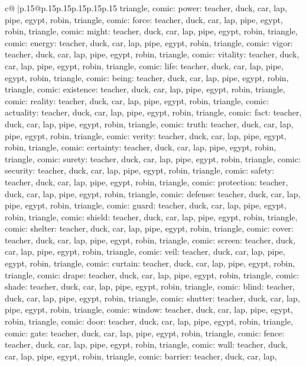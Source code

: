 \documentclass{article}
\begin{document}
{\begin{supertabular}{c@{$\;$}|p{.15\linewidth}@{}p{.15\linewidth}p{.15\linewidth}p{.15\linewidth}p{.15\linewidth}p{.15\linewidth}}
{{{triangle, comic\n\nCLUE: power\nTARGETS: teacher, duck, car, lap, pipe, egypt, robin, triangle, comic\n\nCLUE: force\nTARGETS: teacher, duck, car, lap, pipe, egypt, robin, triangle, comic\n\nCLUE: might\nTARGETS: teacher, duck, car, lap, pipe, egypt, robin, triangle, comic\n\nCLUE: energy\nTARGETS: teacher, duck, car, lap, pipe, egypt, robin, triangle, comic\n\nCLUE: vigor\nTARGETS: teacher, duck, car, lap, pipe, egypt, robin, triangle, comic\n\nCLUE: vitality\nTARGETS: teacher, duck, car, lap, pipe, egypt, robin, triangle, comic\n\nCLUE: life\nTARGETS: teacher, duck, car, lap, pipe, egypt, robin, triangle, comic\n\nCLUE: being\nTARGETS: teacher, duck, car, lap, pipe, egypt, robin, triangle, comic\n\nCLUE: existence\nTARGETS: teacher, duck, car, lap, pipe, egypt, robin, triangle, comic\n\nCLUE: reality\nTARGETS: teacher, duck, car, lap, pipe, egypt, robin, triangle, comic\n\nCLUE: actuality\nTARGETS: teacher, duck, car, lap, pipe, egypt, robin, triangle, comic\n\nCLUE: fact\nTARGETS: teacher, duck, car, lap, pipe, egypt, robin, triangle, comic\n\nCLUE: truth\nTARGETS: teacher, duck, car, lap, pipe, egypt, robin, triangle, comic\n\nCLUE: verity\nTARGETS: teacher, duck, car, lap, pipe, egypt, robin, triangle, comic\n\nCLUE: certainty\nTARGETS: teacher, duck, car, lap, pipe, egypt, robin, triangle, comic\n\nCLUE: surety\nTARGETS: teacher, duck, car, lap, pipe, egypt, robin, triangle, comic\n\nCLUE: security\nTARGETS: teacher, duck, car, lap, pipe, egypt, robin, triangle, comic\n\nCLUE: safety\nTARGETS: teacher, duck, car, lap, pipe, egypt, robin, triangle, comic\n\nCLUE: protection\nTARGETS: teacher, duck, car, lap, pipe, egypt, robin, triangle, comic\n\nCLUE: defense\nTARGETS: teacher, duck, car, lap, pipe, egypt, robin, triangle, comic\n\nCLUE: guard\nTARGETS: teacher, duck, car, lap, pipe, egypt, robin, triangle, comic\n\nCLUE: shield\nTARGETS: teacher, duck, car, lap, pipe, egypt, robin, triangle, comic\n\nCLUE: shelter\nTARGETS: teacher, duck, car, lap, pipe, egypt, robin, triangle, comic\n\nCLUE: cover\nTARGETS: teacher, duck, car, lap, pipe, egypt, robin, triangle, comic\n\nCLUE: screen\nTARGETS: teacher, duck, car, lap, pipe, egypt, robin, triangle, comic\n\nCLUE: veil\nTARGETS: teacher, duck, car, lap, pipe, egypt, robin, triangle, comic\n\nCLUE: curtain\nTARGETS: teacher, duck, car, lap, pipe, egypt, robin, triangle, comic\n\nCLUE: drape\nTARGETS: teacher, duck, car, lap, pipe, egypt, robin, triangle, comic\n\nCLUE: shade\nTARGETS: teacher, duck, car, lap, pipe, egypt, robin, triangle, comic\n\nCLUE: blind\nTARGETS: teacher, duck, car, lap, pipe, egypt, robin, triangle, comic\n\nCLUE: shutter\nTARGETS: teacher, duck, car, lap, pipe, egypt, robin, triangle, comic\n\nCLUE: window\nTARGETS: teacher, duck, car, lap, pipe, egypt, robin, triangle, comic\n\nCLUE: door\nTARGETS: teacher, duck, car, lap, pipe, egypt, robin, triangle, comic\n\nCLUE: gate\nTARGETS: teacher, duck, car, lap, pipe, egypt, robin, triangle, comic\n\nCLUE: fence\nTARGETS: teacher, duck, car, lap, pipe, egypt, robin, triangle, comic\n\nCLUE: wall\nTARGETS: teacher, duck, car, lap, pipe, egypt, robin, triangle, comic\n\nCLUE: barrier\nTARGETS: teacher, duck, car, lap, }}}
\end{supertabular}}
\end{document}
